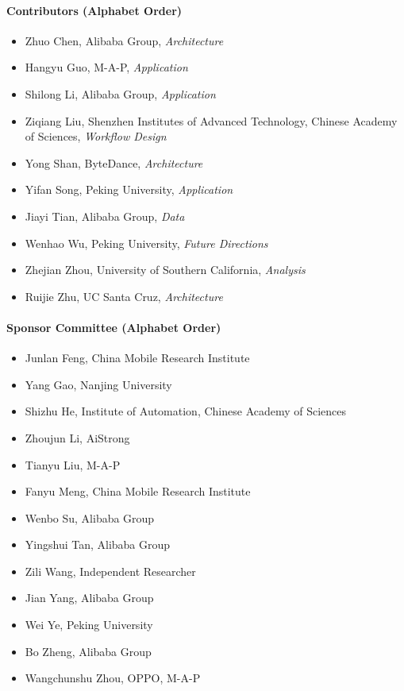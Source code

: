 \documentclass[11pt, a4paper, logo, copyright, nonumbering]{map}
\begin{document}
\paragraph{Contributors (Alphabet Order)}
\begin{itemize}
    \item Zhuo Chen, Alibaba Group, \textit{Architecture}
 \item Hangyu Guo, M-A-P, \textit{Application}
 \item Shilong Li, Alibaba Group, \textit{Application}
 \item Ziqiang Liu, Shenzhen Institutes of Advanced Technology, Chinese Academy of Sciences, \textit{Workflow Design}
 \item Yong Shan, ByteDance,  \textit{Architecture}
 \item Yifan Song, Peking University,  \textit{Application}
 \item Jiayi Tian, Alibaba Group, \textit{Data}
 \item Wenhao Wu, Peking University, \textit{Future Directions}
 \item Zhejian Zhou, University of Southern California, \textit{Analysis}
 \item Ruijie Zhu, UC Santa Cruz, \textit{Architecture}
\end{itemize}

\paragraph{Sponsor Committee (Alphabet Order)}
\begin{itemize}

    \item Junlan Feng, China Mobile Research Institute
 \item Yang Gao, Nanjing University
 \item Shizhu He, Institute of Automation, Chinese Academy of Sciences
 \item Zhoujun Li, AiStrong
 \item Tianyu Liu, M-A-P
 \item Fanyu Meng, China Mobile Research Institute
 \item Wenbo Su, Alibaba Group
 \item Yingshui Tan, Alibaba Group
 \item Zili Wang, Independent Researcher
 \item Jian Yang, Alibaba Group
 \item Wei Ye, Peking University
 \item Bo Zheng, Alibaba Group
 \item Wangchunshu Zhou, OPPO, M-A-P

\end{itemize}
\end{document}
